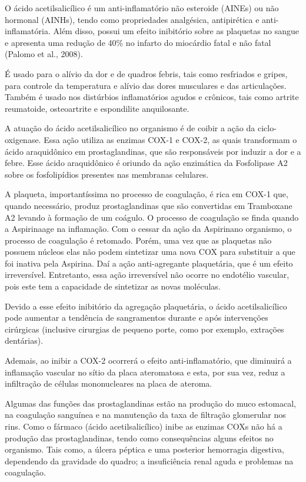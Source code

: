 O ácido acetilsalicílico é um anti-inflamatório não esteroide (AINEs) ou não hormonal (AINHs), tendo
como propriedades analgésica, antipirética e anti-inflamatória. Além disso, possui um efeito
inibitório sobre as plaquetas no sangue e apresenta uma redução de 40\% no infarto do miocárdio
fatal e não fatal (Palomo et al., 2008).

É usado para o alívio da dor e de quadros febris, tais como resfriados e gripes, para controle da
temperatura e alívio das dores musculares e das articulações. Também é usado nos distúrbios
inflamatórios agudos e crônicos, tais como artrite reumatoide, osteoartrite e espondilite
anquilosante.~\cite{bulaaspirina}

A atuação do ácido acetilsalicílico no organismo é de coibir a ação da ciclo-oxigenase. Essa ação
utiliza as enzimas COX-1 e COX-2, as quais transformam o ácido araquidônico em prostaglandinas, que
são responsáveis por induzir a dor e a febre. Esse ácido araquidônico é oriundo da ação enzimática
da Fosfolipase A2 sobre os fosfolipídios presentes nas membranas celulares. 

A plaqueta, importantíssima no processo de coagulação, é rica em COX-1 que, quando necessário,
produz prostaglandinas que são convertidas em Tramboxane A2 levando à formação de um coágulo. O
processo de coagulação se finda quando a Aspirina\R age na inflamação. Com o cessar da ação da
Aspirina\R no organismo, o processo de coagulação é retomado. Porém, uma vez que as plaquetas não
possuem núcleos elas não podem sintetizar uma nova COX para substituir a que foi inativa pela
Aspirina\R. Daí a ação anti-agregante plaquetária, que é um efeito irreversível. Entretanto, essa
ação irreversível não ocorre no endotélio vascular, pois este tem a capacidade de sintetizar as
novas moléculas. 

Devido a esse efeito inibitório da agregação plaquetária, o ácido acetilsalicílico pode aumentar a
tendência de sangramentos durante e após intervenções cirúrgicas (inclusive cirurgias de pequeno
porte, como por exemplo, extrações dentárias).~\cite{bulaaspirina}

Ademais, ao inibir a COX-2 ocorrerá o efeito anti-inflamatório, que diminuirá a inflamação vascular
no sítio da placa ateromatosa e esta, por sua vez, reduz a infiltração de células mononucleares na
placa de ateroma.~\cite{Grassi2012}

Algumas das funções das prostaglandinas estão na produção do muco estomacal, na coagulação sanguínea
e na manutenção da taxa de filtração glomerular nos rins. Como o fármaco (ácido acetilsalicílico)
inibe as enzimas COXs não há a produção das prostaglandinas, tendo como consequências alguns efeitos
no organismo.  Tais como, a úlcera péptica e uma posterior hemorragia digestiva, dependendo da
gravidade do quadro; a insuficiência renal aguda e problemas na coagulação. 

